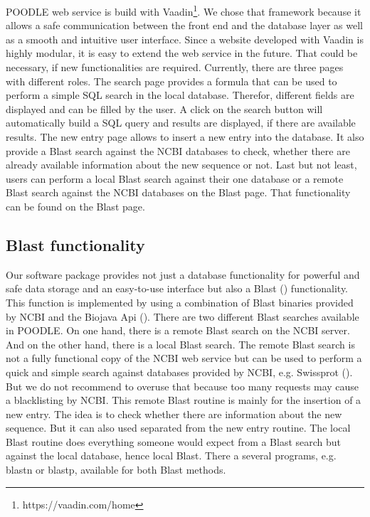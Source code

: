 \documentclass{bioinfo}
\begin{document}
\begin{methods}
POODLE web service is build with Vaadin\footnote{https://vaadin.com/home}. We chose that framework 
because it allows a safe 
communication between the front end and the database layer as well as a smooth and intuitive user 
interface. Since a website developed with Vaadin is highly modular, it is easy to extend the web 
service in the future. That could be necessary, if new functionalities are required. Currently, 
there are three pages with different roles. The search page provides a formula that can be used 
to perform a simple SQL search in the local database. Therefor, different fields are displayed and 
can be filled by the user. A click on the search button will automatically build a SQL query and 
results are displayed, if there are available results. The new entry page allows to insert a new 
entry into the database. It also provide a Blast search against the NCBI databases to check, whether 
there are already available information about the new sequence or not. Last but not least, users can 
perform a local Blast search against their one database or a remote Blast search against the NCBI 
databases on the Blast page. That functionality can be found on the Blast page. 

\subsection{Blast functionality}

Our software package provides not just a database functionality for powerful and safe data storage 
and an easy-to-use interface but also a Blast (\citealp{Altschul01}) functionality. This function 
is implemented by using a combination of Blast binaries provided by NCBI and the Biojava Api 
(\citealp{Prlic01}). There are two different Blast searches available in POODLE. On one hand, there 
is a remote Blast search on the NCBI server. And on the other hand, there is a local Blast search. 
The remote Blast search is not a fully functional copy of the NCBI web service but can be used to 
perform a quick and simple search against databases provided by NCBI, e.g. Swissprot (\citealp{Donavan01}). But we 
do not recommend to overuse that because too many requests may cause a blacklisting by NCBI. This 
remote Blast routine is mainly for the insertion of a new entry. The idea is to check whether there 
are information about the new sequence. But it can also used separated from the new entry routine. 
The local Blast routine does everything someone would 
expect from a Blast search but against the local database, hence local Blast. There a several programs, 
e.g. blastn or blastp, available for both Blast methods. 

\end{methods}
\end{document}
